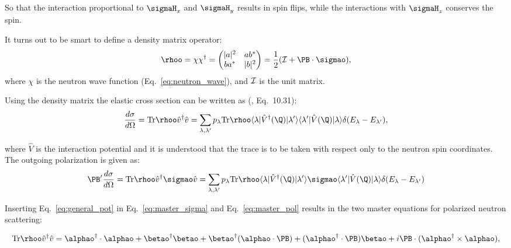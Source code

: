 So that the interaction proportional to $\sigmaH_x$ and $\sigmaH_y$
results in spin flips, while the interactions with $\sigmaH_z$
conserves the spin.

It turns out to be smart to define a density matrix operator:
\begin{equation}
  \rhoo = \chi \chi^\dagger =
  \left( \begin{matrix}
    |a|^2 & ab^\ast \\
    ba^\ast & |b|^2
  \end{matrix} \right)
  = \frac{1}{2}({\cal I}+\PB \cdot \sigmao),
\end{equation}
where $\chi$ is the neutron wave function (Eq.~\ref{eq:neutron_wave}),
and ${\cal I}$ is the unit matrix.

Using the density matrix the elastic cross section can be written as
(\cite{lovesey84}, Eq.~10.31):
\begin{equation}
  \label{eq:master_sigma}
  \frac{d\sigma}{d\Omega} = \text{Tr} \rhoo \hat{v}^\dagger \hat{v}
  = \sum_{\lambda, \lambda'} p_\lambda \text{Tr} \rhoo
  \langle \lambda | \hat{V}^\dagger(\Q) | \lambda' \rangle
  \langle \lambda' | \hat{V}(\Q) | \lambda \rangle
  \delta(E_\lambda - E_{\lambda'}),
\end{equation}

where $\hat{V}$ is the interaction potential and it is understood that
the trace is to be taken with respect only to the neutron spin
coordinates. The outgoing polarization is given as:
\begin{equation}
  \label{eq:master_pol}
  \PB' \frac{d\sigma}{d\Omega} =
  \text{Tr} \rhoo \hat{v}^\dagger \sigmao \hat{v}
  = \sum_{\lambda, \lambda'} p_\lambda \text{Tr} \rhoo
  \langle \lambda | \hat{V}^\dagger(\Q) | \lambda' \rangle
  \sigmao
  \langle \lambda' | \hat{V}(\Q) | \lambda \rangle
  \delta(E_\lambda - E_{\lambda'})
\end{equation}

Inserting Eq.~\ref{eq:general_pot} in Eq.~\ref{eq:master_sigma} and
Eq.~\ref{eq:master_pol} results in the two master equations for
polarized neutron scattering:

\begin{equation}
  \label{eq:general_sigma}
  \text{Tr} \rhoo \hat{v}^\dagger \hat{v} =
  \alphao^\dagger \cdot \alphao + \betao^\dagger \betao+
  \betao^\dagger (\alphao \cdot \PB) +
  (\alphao^\dagger \cdot \PB) \betao +
  i\PB \cdot (\alphao^\dagger \times \alphao),
\end{equation}

